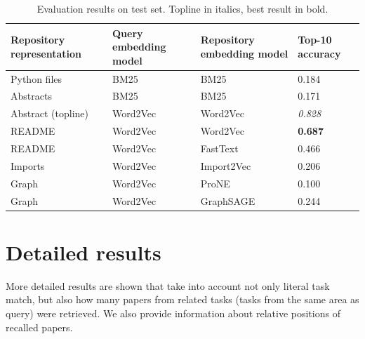 \documentclass[11pt]{report}
\begin{document}
\begin{table}[htbp]
  \centering
  \caption{Evaluation results on test set. Topline in italics, best result in bold.}
 \begin{tabular}{ |p{3cm}|p{2cm}|p{2cm}|p{2cm}|}
 \hline
  Repository \newline representation & Query \newline embedding model &  Repository embedding model & Top-10 \newline accuracy \\
 \hline 
   Python files & BM25 & BM25 & 0.184 \\ 
  Abstracts & BM25 & BM25 & 0.171 \\ 
  Abstract (topline)                 & Word2Vec              & Word2Vec                   &        \textit{0.828} \\
  README                    & Word2Vec              & Word2Vec                   &            \textbf{0.687} \\
  README                    & Word2Vec              & FastText                   &           0.466 \\
  Imports                   & Word2Vec              & Import2Vec                 &        0.206 \\
  Graph                     & Word2Vec              & ProNE                      &            0.100 \\
  Graph                     & Word2Vec              & GraphSAGE                            & 0.244         \\
 \hline
 \end{tabular}
\end{table}


\section{Detailed results}

More detailed results are shown that take into account not only literal task match, but also how many papers from related tasks (tasks from the same area as query) were retrieved. We also provide information about relative positions of recalled papers.
\end{document}
